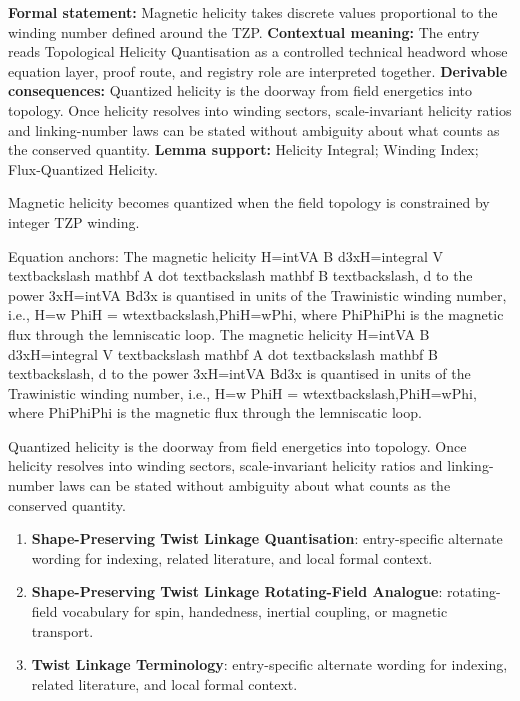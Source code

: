 \begingroup\footnotesize\setlength{\emergencystretch}{3em}\sloppy
\textbf{Formal statement:} Magnetic helicity takes discrete values proportional to the winding number defined around the TZP. \textbf{Contextual meaning:} The entry reads Topological Helicity Quantisation as a controlled technical headword whose equation layer, proof route, and registry role are interpreted together. \textbf{Derivable consequences:} Quantized helicity is the doorway from field energetics into topology. Once helicity resolves into winding sectors, scale-invariant helicity ratios and linking-number laws can be stated without ambiguity about what counts as the conserved quantity. \textbf{Lemma support:} Helicity Integral; Winding Index; Flux-Quantized Helicity.\par
\endgroup

Magnetic helicity becomes quantized when the field topology is constrained by integer TZP winding.

Equation anchors: The magnetic helicity H=intVA B d3xH=integral V textbackslash mathbf A dot textbackslash mathbf B textbackslash, d to the power 3xH=intVA Bd3x is quantised in units of the Trawinistic winding number, i.e., H=w PhiH = wtextbackslash,PhiH=wPhi, where PhiPhiPhi is the magnetic flux through the lemniscatic loop. The magnetic helicity H=intVA B d3xH=integral V textbackslash mathbf A dot textbackslash mathbf B textbackslash, d to the power 3xH=intVA Bd3x is quantised in units of the Trawinistic winding number, i.e., H=w PhiH = wtextbackslash,PhiH=wPhi, where PhiPhiPhi is the magnetic flux through the lemniscatic loop.

Quantized helicity is the doorway from field energetics into topology. Once helicity resolves into winding sectors, scale-invariant helicity ratios and linking-number laws can be stated without ambiguity about what counts as the conserved quantity.
\endgroup

\begingroup\footnotesize\sloppy
\begin{enumerate}[leftmargin=1.35em,itemsep=1pt,topsep=1pt,parsep=0pt]
\item \textbf{Shape-Preserving Twist Linkage Quantisation}: entry-specific alternate wording for indexing, related literature, and local formal context.
\item \textbf{Shape-Preserving Twist Linkage Rotating-Field Analogue}: rotating-field vocabulary for spin, handedness, inertial coupling, or magnetic transport.
\item \textbf{Twist Linkage Terminology}: entry-specific alternate wording for indexing, related literature, and local formal context.
\end{enumerate}
\endgroup

